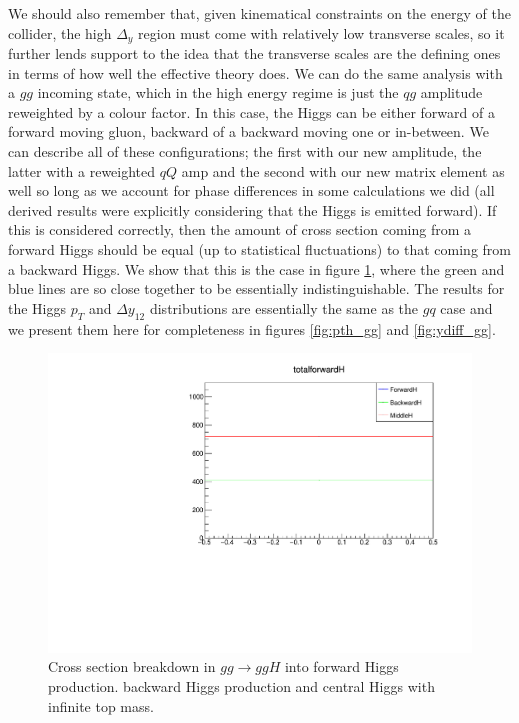 We should also remember that, given kinematical constraints on the energy of the collider, the high $\Delta_y$ region must come with relatively low transverse scales, so it further lends support to the idea that the transverse scales are the defining ones in terms of how well the effective theory does. We can do the same analysis with a $gg$ incoming state, which in the high energy regime is just the $qg$ amplitude reweighted by a colour factor. In this case, the Higgs can be either forward of a forward moving gluon, backward of a backward moving one or in-between. We can describe all of these configurations; the first with our new amplitude, the latter with a reweighted $qQ$ amp and the second with our new matrix element as well so long as we account for phase differences in some calculations we did (all derived results were explicitly considering that the Higgs is emitted forward). If this is considered correctly, then the amount of cross section coming from a forward Higgs should be equal (up to statistical fluctuations) to that coming from a backward Higgs. We show that this is the case in figure \ref{fig:gg_crosssection}, where the green and blue lines are so close together to be essentially indistinguishable. The results for the Higgs $p_T$ and $\Delta y_{12}$ distributions are essentially the same as the $gq$ case and we present them here for completeness in figures \ref{fig:pth_gg} and \ref{fig:ydiff_gg}. 

\begin{figure}[t]
\centering
\includegraphics[scale=0.75]{Images/xsec_breakdown_ggh.pdf}
\caption{Cross section breakdown in $gg \to ggH$ into forward Higgs production. backward Higgs production and central Higgs with infinite top mass.}
\label{fig:gg_crosssection}
\end{figure}

